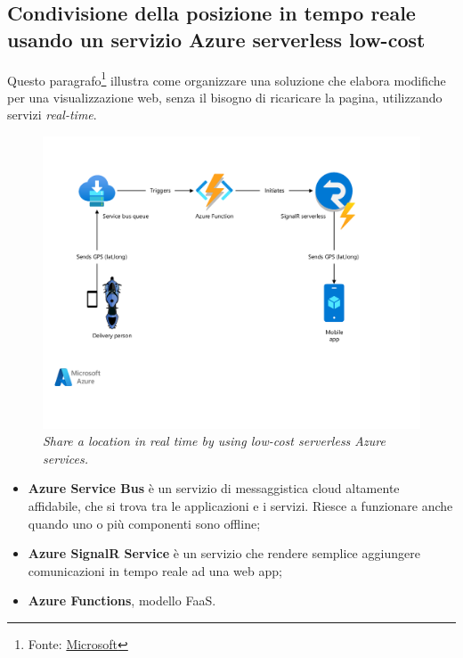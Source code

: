 \documentclass[a4paper]{article}
\begin{document}
	\subsection{Condivisione della posizione in tempo reale usando un servizio Azure serverless low-cost}
	
	Questo paragrafo\footnote{Fonte: \href{https://learn.microsoft.com/en-us/azure/architecture/example-scenario/signalr/}{Microsoft}} illustra come organizzare una soluzione che elabora modifiche per una visualizzazione web, senza il bisogno di ricaricare la pagina, utilizzando servizi \emph{real-time}.
	\begin{figure}[!htp]
		\centering
		\includegraphics[width=\textwidth]{img/archdiagram.pdf}
		\caption{\emph{Share a location in real time by using low-cost serverless Azure services.}}
	\end{figure}
	
	\begin{itemize}
		\item \textbf{Azure Service Bus} è un servizio di messaggistica cloud altamente affidabile, che si trova tra le applicazioni e i servizi. Riesce a funzionare anche quando uno o più componenti sono offline;
		
		\item \textbf{Azure SignalR Service} è un servizio che rendere semplice aggiungere comunicazioni in tempo reale ad una web app;
		
		\item \textbf{Azure Functions}, modello FaaS.
	\end{itemize}\newpage
	
\end{document}
